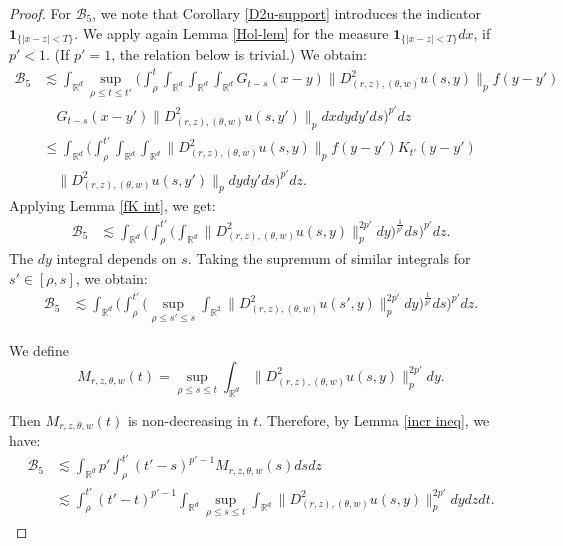 \documentclass[12pt]{article}
\def\cB{\mathcal{B}}
\def\bR{\mathbb{R}}
\newcommand{\les}{\lesssim}
\begin{document}
\begin{proof}
For $\cB_5$, we note that Corollary \ref{D2u-support} introduces the indicator $\mathbf 1_{\{|x-z| < T\}}$. We apply again Lemma \ref{Hol-lem} for the measure $\mathbf 1_{\{|x-z| < T\}}dx$, if $p'< 1$. (If $p'=1$, the relation below is trivial.) We obtain:
\begin{align*}
  \cB_5 & \les \int_{\bR^d} \sup_{\rho \leq t \leq t'}  \bigg(\int_\rho^t  \int_{\bR^d} \int_{\bR^d} \int_{\bR^d} G_{t-s}(x-y) \|D^2_{(r,z),(\theta,w)}u(s,y)\|_{p} f(y-y') \\
 & \quad G_{t-s}(x-y') \|D^2_{(r,z),(\theta,w)}u(s,y')\|_{p} dx dy dy' ds \bigg)^{p'} dz \\
 & \leq \int_{\bR^d} \bigg(\int_\rho^{t'}  \int_{\bR^d} \int_{\bR^d}  \|D^2_{(r,z),(\theta,w)}u(s,y)\|_{p} f(y-y')K_{t'}(y-y')  \\
 & \quad \|D^2_{(r,z),(\theta,w)}u(s,y')\|_{p} dy dy' ds \bigg)^{p'} dz.
\end{align*}
Applying Lemma \ref{fK int}, we get: %
\begin{align*}
  \cB_5 & \les \int_{\bR^d} \bigg(\int_\rho^{t'}  \bigg(\int_{\bR^d}  \|D^2_{(r,z),(\theta,w)}u(s,y)\|^{2p'}_{p} dy \bigg)^{\frac{1}{p'}} ds \bigg)^{p'} dz.
\end{align*}
The $dy$ integral depends on $s$. Taking the supremum of similar integrals for $s' \in [\rho,s]$, we obtain:
\begin{align*}
  \cB_5 & \les \int_{\bR^d} \bigg( \int_\rho^{t'}  \bigg(\sup_{\rho \leq s'\leq s} \int_{\bR^2}  \|D^2_{(r,z),(\theta,w)}u(s',y)\|^{2p'}_{p} dy \bigg)^{\frac{1}{p'}} ds \bigg)^{p'} dz. 
\end{align*}


We define $$M_{r,z,\theta,w}(t) = \sup_{\rho \leq s \leq t} \int_{\bR^d}  \|D^2_{(r,z),(\theta,w)}u(s,y)\|^{2p'}_{p} dy.$$ 

Then $M_{r,z,\theta,w}(t)$ is non-decreasing in $t$. Therefore, by Lemma \ref{incr ineq}, we have: 
\begin{align*}
  \cB_5 & \les  \int_{\bR^d} p'\int_\rho^{t'} (t'-s)^{p'-1} M_{r,z,\theta,w}(s) ds dz \\
  & \les \int_\rho^{t'} (t'-t)^{p'-1} \int_{\bR^d} \sup_{\rho \leq s \leq t} \int_{\bR^d}  \|D^2_{(r,z),(\theta,w)}u(s,y)\|^{2p'}_{p} dy dz dt.
\end{align*}


\end{proof}
\end{document}
